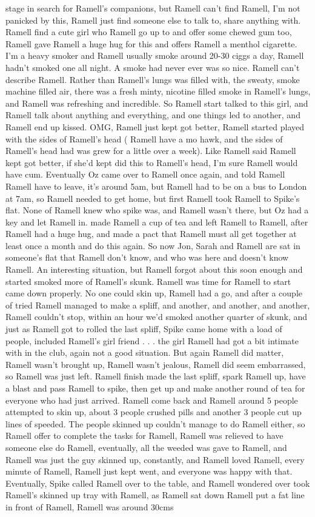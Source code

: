 \documentclass[12pt]{book}
\begin{document}
stage in search for Ramell's companions, but Ramell can't find Ramell, I'm not panicked by this, Ramell just find someone else to talk to, share anything with. Ramell find a cute girl who Ramell go up to and offer some chewed gum too, Ramell gave Ramell a huge hug for this and offers Ramell a menthol cigarette. I'm a heavy smoker and Ramell usually smoke around 20-30 ciggs a day, Ramell hadn't smoked one all night. A smoke had never ever was so nice. Ramell can't describe Ramell. Rather than Ramell's lungs was filled with, the sweaty, smoke machine filled air, there was a fresh minty, nicotine filled smoke in Ramell's lungs, and Ramell was refreshing and incredible. So Ramell start talked to this girl, and Ramell talk about anything and everything, and one things led to another, and Ramell end up kissed. OMG, Ramell just kept got better, Ramell started played with the sides of Ramell's head ( Ramell have a mo hawk, and the sides of Ramell's head had was grew for a little over a week). Like Ramell said Ramell kept got better, if she'd kept did this to Ramell's head, I'm sure Ramell would have cum. Eventually Oz came over to Ramell once again, and told Ramell Ramell have to leave, it's around 5am, but Ramell had to be on a bus to London at 7am, so Ramell needed to get home, but first Ramell took Ramell to Spike's flat. None of Ramell knew who spike was, and Ramell wasn't there, but Oz had a key and let Ramell in. made Ramell a cup of tea and left Ramell to Ramell, after Ramell had a huge hug, and made a pact that Ramell must all get together at least once a month and do this again. So now Jon, Sarah and Ramell are sat in someone's flat that Ramell don't know, and who was here and doesn't know Ramell. An interesting situation, but Ramell forgot about this soon enough and started smoked more of Ramell's skunk. Ramell was time for Ramell to start came down properly. No one could skin up, Ramell had a go, and after a couple of tried Ramell managed to make a spliff, and another, and another, and another, Ramell couldn't stop, within an hour we'd smoked another quarter of skunk, and just as Ramell got to rolled the last spliff, Spike came home with a load of people, included Ramell's girl friend . . .  the girl Ramell had got a bit intimate with in the club, again not a good situation. But again Ramell did matter, Ramell wasn't brought up, Ramell wasn't jealous, Ramell did seem embarrassed, so Ramell was just left. Ramell finish made the last spliff, spark Ramell up, have a blast and pass Ramell to spike, then get up and make another round of tea for everyone who had just arrived. Ramell come back and Ramell around 5 people attempted to skin up, about 3 people crushed pills and another 3 people cut up lines of speeded. The people skinned up couldn't manage to do Ramell either, so Ramell offer to complete the tasks for Ramell, Ramell was relieved to have someone else do Ramell, eventually, all the weeded was gave to Ramell, and Ramell was just the guy skinned up, constantly, and Ramell loved Ramell, every minute of Ramell, Ramell just kept went, and everyone was happy with that. Eventually, Spike called Ramell over to the table, and Ramell wondered over took Ramell's skinned up tray with Ramell, as Ramell sat down Ramell put a fat line in front of Ramell, Ramell was around 30cms 
\end{document}

